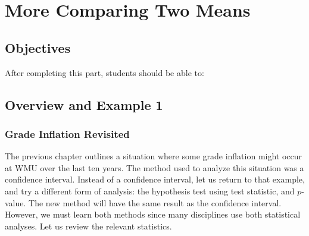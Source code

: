 \documentclass[11pt]{book}\usepackage[]{graphicx}\usepackage[]{color}
\begin{document}
\begin{exercises}
\begin{exercise}
\end{exercise}
\begin{solution}  %


\end{solution}


\end{exercises}


\onecolumn












\chapter{More Comparing Two Means}
\label{chap:ch13}

\section{Objectives}

After completing this part, students should be able to:


\section{Overview and Example 1}

\subsection{Grade Inflation Revisited}

The previous chapter outlines a situation where some grade inflation might occur at WMU over the last ten years.  The method used to analyze this situation was a confidence interval.  Instead of a confidence interval, let us return to that example, and try a different form of analysis:  the hypothesis test using test statistic, and $p$-value.  The new method will have the same result as the confidence interval.  However, we must learn both methods since many disciplines use both statistical analyses.  Let us review the relevant statistics.
\end{document}
